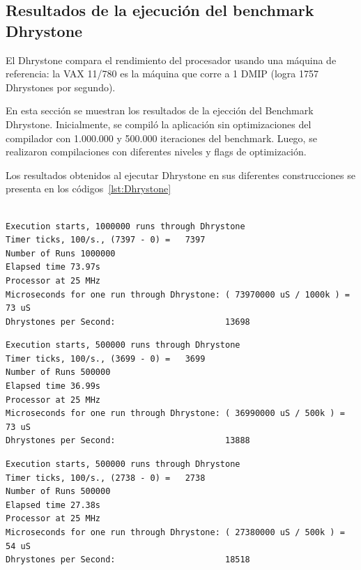 \clearpage
\newpage

		\subsection{Resultados de la ejecución del benchmark Dhrystone}
El Dhrystone compara el rendimiento del procesador usando una máquina de referencia: la VAX 11/780 es la máquina que corre a 1 DMIP (logra 1757 Dhrystones por segundo).

En esta sección se muestran los resultados de la ejección del Benchmark Dhrystone. Inicialmente, se compiló la aplicación sin optimizaciones del compilador con 1.000.000 y 500.000 iteraciones del benchmark. Luego, se realizaron compilaciones con diferentes niveles y flags de optimización. 

Los resultados obtenidos al ejecutar Dhrystone en sus diferentes construcciones se presenta en los códigos~\ref{lst:Dhrystone}

\begin{lstlisting}[frame=single,caption={Sin optimizaciones },label={lst:Dhrystone},breaklines]

Execution starts, 1000000 runs through Dhrystone
Timer ticks, 100/s., (7397 - 0) =	7397
Number of Runs 1000000
Elapsed time 73.97s
Processor at 25 MHz
Microseconds for one run through Dhrystone: ( 73970000 uS / 1000k ) = 73 uS
Dhrystones per Second:                      13698 
\end{lstlisting}

\begin{lstlisting}[frame=single,caption={Optimización nivel -O2},label={lst:salidas},breaklines]
Execution starts, 500000 runs through Dhrystone
Timer ticks, 100/s., (3699 - 0) =	3699
Number of Runs 500000
Elapsed time 36.99s
Processor at 25 MHz
Microseconds for one run through Dhrystone: ( 36990000 uS / 500k ) = 73 uS
Dhrystones per Second:                      13888 
\end{lstlisting}

\begin{lstlisting}[frame=single,caption={Optimización nivel -O3},label={lst:salidas},breaklines]
Execution starts, 500000 runs through Dhrystone
Timer ticks, 100/s., (2738 - 0) =	2738
Number of Runs 500000
Elapsed time 27.38s
Processor at 25 MHz
Microseconds for one run through Dhrystone: ( 27380000 uS / 500k ) = 54 uS
Dhrystones per Second:                      18518 
\end{lstlisting}


